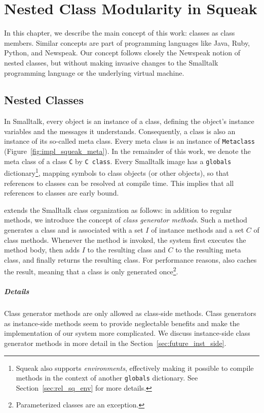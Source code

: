 \chapter{Nested Class Modularity in Squeak}
\label{sec:concept}
In this chapter, we describe the main concept of this work: classes as class members. Similar concepts are part of programming languages like Java, Ruby, Python, and Newspeak. Our concept follows closely the Newspeak notion of nested classes, but without making invasive changes to the Smalltalk programming language or the underlying virtual machine.

\section{Nested Classes}
In Smalltalk, every object is an instance of a class, defining the object's instance variables and the messages it understands. Consequently, a class is also an instance of its so-called meta class. Every meta class is an instance of \texttt{Metaclass} (Figure~\ref{fig:impl_squeak_meta}). In the remainder of this work, we denote the meta class of a class \texttt{C} by \texttt{C class}. Every Smalltalk image has a \texttt{globals} dictionary\footnote{Squeak also supports \emph{environments}, effectively making it possible to compile methods in the context of another \texttt{globals} dictionary. See Section~\ref{sec:rel_sq_env} for more details.}, mapping symbols to class objects (or other objects), so that references to classes can be resolved at compile time. This implies that all references to classes are early bound.

\msname extends the Smalltalk class organization as follows: in addition to regular methods, we introduce the concept of \emph{class generator methods}. Such a method generates a class and is associated with a set $I$ of instance methods and a set $C$ of class methods. Whenever the method is invoked, the system first executes the method body, then adds $I$ to the resulting class and $C$ to the resulting meta class, and finally returns the resulting class. For performance reasons, \msname also caches the result, meaning that a class is only generated once\footnote{Parameterized classes are an exception.}.

\paragraph{Details}
Class generator methods are only allowed as class-side methods. Class generators as instance-side methods seem to provide neglectable benefits and make the implementation of our system more complicated. We discuss instance-side class generator methods in more detail in the Section~\ref{sec:future_inst_side}.

